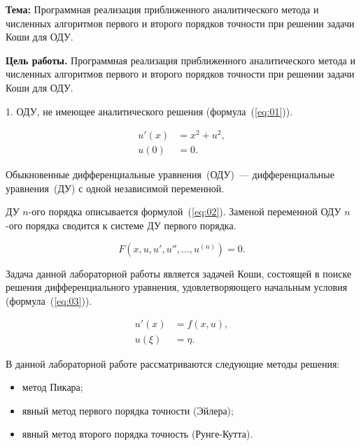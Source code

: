 \textbf{Тема:} Программная реализация приближенного аналитического метода и
численных алгоритмов первого и второго порядков точности при решении задачи Коши
для ОДУ.

\textbf{Цель работы.} Программная реализация приближенного аналитического метода
и численных алгоритмов первого и второго порядков точности при решении задачи
Коши для ОДУ.



1. ОДУ, не имеющее аналитического решения (формула~(\ref{eq:01})).

\begin{equation}\label{eq:01}
    \begin{aligned}
        u'(x) &= x^2 + u^2,\\
        u(0)~ &= 0.
    \end{aligned}
\end{equation}


Обыкновенные дифференциальные уравнения~(ОДУ)~--- дифференциальные
уравнения~(ДУ) с одной независимой переменной.

ДУ $n$-ого порядка описывается формулой~(\ref{eq:02}). Заменой
переменной ОДУ $n$-ого порядка сводится к системе ДУ первого порядка.

\begin{equation}\label{eq:02}
    F(x, u, u', u'', ..., u^{(n)}) = 0.
\end{equation}

Задача данной лабораторной работы является задачей Коши, состоящей в поиске
решения дифференциального уравнения, удовлетворяющего начальным условия
(формула~(\ref{eq:03})).

\begin{equation}\label{eq:03}
    \begin{aligned}
        u'(x) &= f(x, u),\\
        u(\xi)~ &= \eta.
    \end{aligned}
\end{equation}

В данной лабораторной работе рассматриваются следующие методы решения:
\begin{itemize}
    \item метод Пикара;
    \item явный метод первого порядка точности (Эйлера);
    \item явный метод второго порядка точность (Рунге-Кутта).
\end{itemize}

